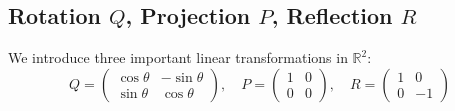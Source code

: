 \subsection{Rotation $Q$, Projection $P$, Reflection $R$}
We introduce three important linear transformations in $\mathbb{R}^2$:
\[
    Q = \begin{pmatrix}
        \cos \theta & -\sin \theta \\
        \sin \theta & \cos \theta
    \end{pmatrix}, \quad P = \begin{pmatrix}
        1 & 0 \\
        0 & 0
    \end{pmatrix}, \quad R = \begin{pmatrix}
        1 & 0 \\
        0 & -1
    \end{pmatrix}
\]


